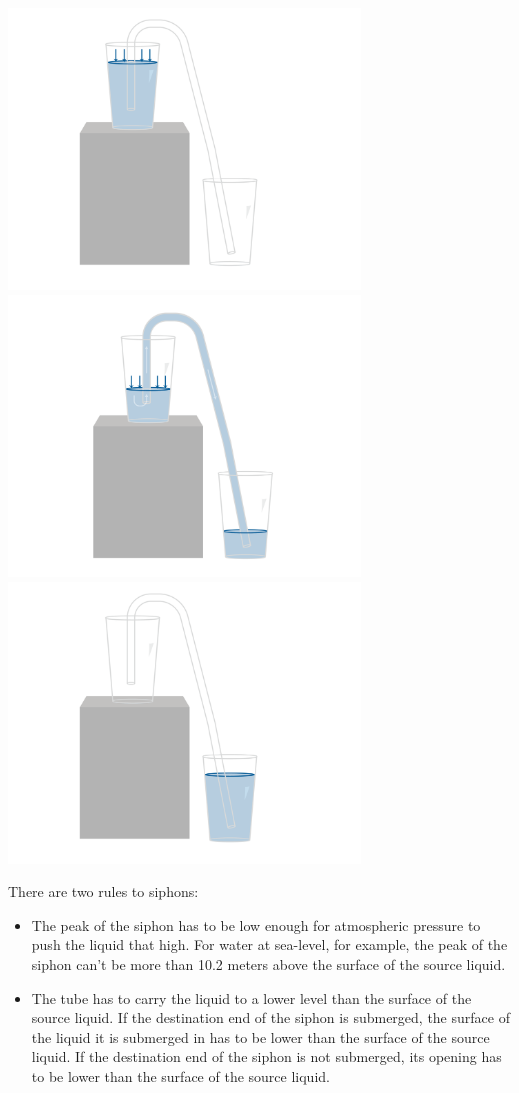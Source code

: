 \includegraphics[width=0.7\textwidth]{siphonStraw1.png}
\includegraphics[width=0.7\textwidth]{siphonStraw2.png}
\includegraphics[width=0.7\textwidth]{siphonStraw3.png}


There are two rules to siphons:
\begin{itemize}
\item The peak of the siphon has to be low enough for atmospheric pressure to push the liquid that high.  For water at sea-level, for example,  the peak of the siphon can't be more than 10.2 meters above the surface of the source liquid. 

\item  The tube has to carry the liquid to a lower level than the surface of the source liquid.   If the destination end of the siphon is submerged,  the surface of the liquid it is submerged in has to be lower than the surface of the source liquid.  If the destination end of the siphon is not submerged,  its opening has to be lower than the surface of the source liquid.
\end{itemize}

